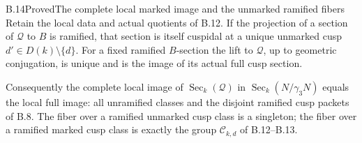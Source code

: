 \begin{statement}{B.14}{Proved}{The complete local marked image and the unmarked ramified fibers}
Retain the local data and actual quotients of B.12.
If the projection of a section of $\mathscr Q$ to $B$
is ramified, that section is itself cuspidal at a
unique unmarked cusp $d'\in D(k)\setminus\{d\}$.
For a fixed ramified $B$-section the lift to
$\mathscr Q$, up to geometric conjugation, is unique
and is the image of its actual full cusp section.

Consequently the complete local image of
$\operatorname{Sec}_k(\mathscr Q)$ in
$\operatorname{Sec}_k(N/\gamma_3N)$ equals the
local full image: all unramified classes and the
disjoint ramified cusp packets of B.8.
The fiber over a ramified unmarked cusp class is
a singleton; the fiber over a ramified marked
cusp class is exactly the group $\mathcal C_{k,d}$
of B.12--B.13.
\end{statement}
